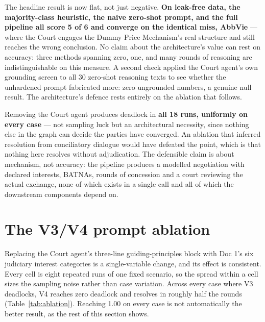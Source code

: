 The headline result is now flat, not just negative. \textbf{On leak-free
data, the majority-class heuristic, the naive zero-shot prompt, and the full
pipeline all score 5 of 6 and converge on the identical miss, AbbVie} ---
where the Court engages the Dummy Price Mechanism's real structure and
still reaches the wrong conclusion. No claim about the architecture's value
can rest on accuracy: three methods spanning zero, one, and many rounds of
reasoning are indistinguishable on this measure. A second check applied the
Court agent's own grounding screen to all 30 zero-shot reasoning texts to
see whether the unhardened prompt fabricated more: zero ungrounded numbers,
a genuine null result. The architecture's defence rests entirely on the
ablation that follows.

Removing the Court agent produces deadlock in \textbf{all 18 runs, uniformly
on every case} --- not sampling luck but an architectural necessity, since
nothing else in the graph can decide the parties have converged. An
ablation that inferred resolution from conciliatory dialogue would have
defeated the point, which is that nothing here resolves without
adjudication. The defensible claim is about mechanism, not accuracy: the
pipeline produces a modelled negotiation with declared interests, BATNAs,
rounds of concession and a court reviewing the actual exchange, none of
which exists in a single call and all of which the downstream components
depend on.

\section{The V3/V4 prompt ablation}
\label{sec:ablation}

Replacing the Court agent's three-line guiding-principles block with Doc 1's
six judiciary interest categories is a single-variable change, and its
effect is consistent. Every cell is eight repeated runs of one fixed
scenario, so the spread within a cell sizes the sampling noise rather than
case variation. Across every case where V3 deadlocks, V4 reaches zero
deadlock and resolves in roughly half the rounds (Table~\ref{tab:ablation}).
Reaching 1.00 on every case is not automatically the better result, as the
rest of this section shows.

